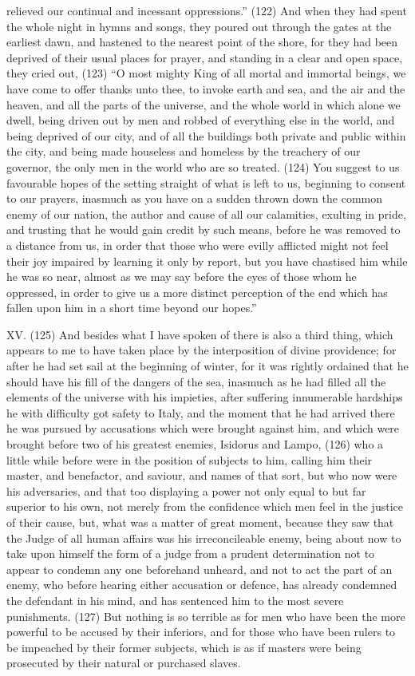relieved our continual and incessant oppressions.'' (122) And when they had spent the whole night
in hymns and songs, they poured out through the gates at the earliest dawn, and hastened to the
nearest point of the shore, for they had been deprived of their usual places for prayer, and
standing in a clear and open space, they cried out, (123) ``O most mighty King of all mortal and
immortal beings, we have come to offer thanks unto thee, to invoke earth and sea, and the air and
the heaven, and all the parts of the universe, and the whole world in which alone we dwell, being
driven out by men and robbed of everything else in the world, and being deprived of our city, and of
all the buildings both private and public within the city, and being made houseless and homeless by
the treachery of our governor, the only men in the world who are so treated. (124) You suggest to
us favourable hopes of the setting straight of what is left to us, beginning to consent to our prayers,
inasmuch as you have on a sudden thrown down the common enemy of our nation, the author and
cause of all our calamities, exulting in pride, and trusting that he would gain credit by such means,
before he was removed to a distance from us, in order that those who were evilly afflicted might not
feel their joy impaired by learning it only by report, but you have chastised him while he was so
near, almost as we may say before the eyes of those whom he oppressed, in order to give us a
more distinct perception of the end which has fallen upon him in a short time beyond our hopes.''

XV. (125) And besides what I have spoken of there is also a third thing, which appears to me to
have taken place by the interposition of divine providence; for after he had set sail at the beginning
of winter, for it was rightly ordained that he should have his fill of the dangers of the sea, inasmuch
as he had filled all the elements of the universe with his impieties, after suffering innumerable
hardships he with difficulty got safety to Italy, and the moment that he had arrived there he was
pursued by accusations which were brought against him, and which were brought before two of his
greatest enemies, Isidorus and Lampo, (126) who a little while before were in the position of
subjects to him, calling him their master, and benefactor, and saviour, and names of that sort, but
who now were his adversaries, and that too displaying a power not only equal to but far superior to
his own, not merely from the confidence which men feel in the justice of their cause, but, what was
a matter of great moment, because they saw that the Judge of all human affairs was his
irreconcileable enemy, being about now to take upon himself the form of a judge from a prudent
determination not to appear to condemn any one beforehand unheard, and not to act the part of an
enemy, who before hearing either accusation or defence, has already condemned the defendant in
his mind, and has sentenced him to the most severe punishments. (127) But nothing is so terrible
as for men who have been the more powerful to be accused by their inferiors, and for those who
have been rulers to be impeached by their former subjects, which is as if masters were being
prosecuted by their natural or purchased slaves.

